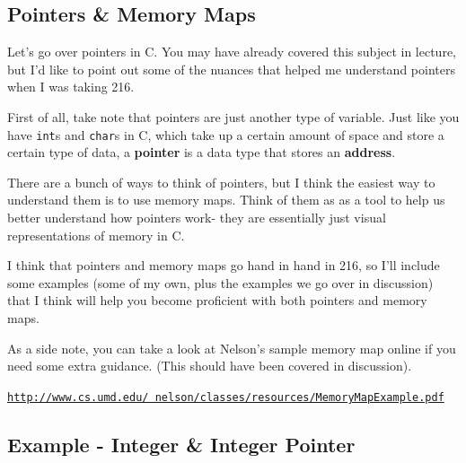 \documentclass[english, 10pt]{article}
\begin{document}
\subsection{Pointers \& Memory Maps}

Let's go over pointers in C. You may have already covered this subject in lecture, but I'd like to point out some of the nuances that helped me understand pointers when I was taking 216. \newline

First of all, take note that pointers are just another type of variable. Just like you have \texttt{int}s and \texttt{char}s in C, which take up a certain amount of space and store a certain type of data, a \textbf{pointer} is a data type that stores an \textbf{address}. \newline

There are a bunch of ways to think of pointers, but I think the easiest way to understand them is to use memory maps. Think of them as as a tool to help us better understand how pointers work- they are essentially just visual representations of memory in C. \newline

I think that pointers and memory maps go hand in hand in 216, so I'll include some examples (some of my own, plus the examples we go over in discussion) that I think will help you become proficient with both pointers and memory maps. \newline

As a side note, you can take a look at Nelson's sample memory map online if you need some extra guidance. (This should have been covered in discussion). \newline

\texttt{\href{http://www.cs.umd.edu/~nelson/classes/resources/MemoryMapExample.pdf}{http://www.cs.umd.edu/~nelson/classes/resources/MemoryMapExample.pdf}}




\subsection{Example - Integer \& Integer Pointer\newline} 
\end{document}
